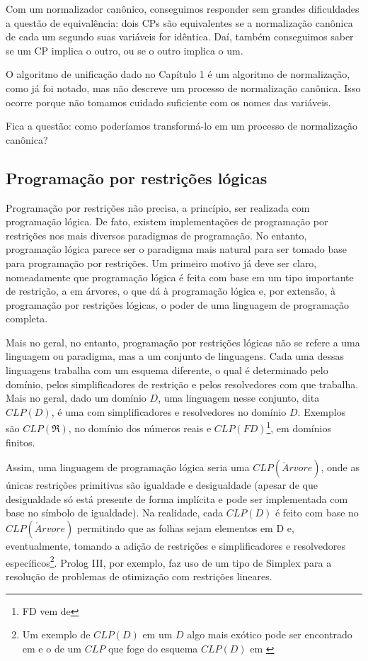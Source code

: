  Com um normalizador canônico, conseguimos responder sem grandes dificuldades a questão de equivalência: dois CPs são equivalentes se a normalização canônica de cada um segundo suas variáveis for idêntica. Daí, também conseguimos saber se um CP implica o outro, ou se o outro implica o um.

  O algoritmo de unificação dado no Capítulo 1 %
é um algoritmo de normalização, como já foi notado, mas não descreve um processo de normalização canônica. Isso ocorre porque não tomamos cuidado suficiente com os nomes das variáveis.

Fica a questão: como poderíamos transformá-lo em um processo de normalização canônica?

\subsection{Programação por restrições lógicas}

Programação por restrições não precisa, a princípio, ser realizada com programação lógica. De fato, existem implementações de
programação por restrições nos mais diversos paradigmas de programação. No entanto, programação lógica parece ser o paradigma mais natural
para ser tomado base para programação por restrições. Um primeiro motivo já deve ser claro, nomeadamente que programação lógica é feita com base em um tipo importante de restrição, a em árvores, o que dá à programação lógica e, por extensão, à programação
por restrições lógicas, o poder de uma linguagem de programação completa.

Mais no geral, no entanto, programação por restrições lógicas não se refere a uma linguagem ou paradigma, mas a um conjunto
de linguagens. Cada uma dessas linguagens trabalha com um esquema diferente, o qual é determinado pelo domínio,
pelos simplificadores de restrição e pelos resolvedores com que trabalha. Mais no geral, dado um domínio $D$,
uma linguagem nesse conjunto, dita $CLP(D)$, é uma com simplificadores e resolvedores no domínio $D$.
Exemplos são $CLP(\Re)$, no domínio dos números reais e $CLP(FD)$\footnote{FD vem de }, em domínios finitos.

Assim, uma linguagem de programação lógica  seria uma $CLP(\acute{A}rvore)$, onde as únicas restrições primitivas são igualdade e desigualdade (apesar de que desigualdade só está presente de forma implícita e pode ser implementada com base no símbolo de igualdade).
Na realidade, cada $CLP(D)$ é feito com base no $CLP(\acute{A}rvore)$ permitindo que as folhas sejam elementos em D e, eventualmente, tomando a adição de restrições e simplificadores e resolvedores específicos\footnote{Um exemplo de $CLP(D)$ em um $D$ algo mais exótico pode ser encontrado em \cite{besik} e o de um $CLP$ que foge do esquema $CLP(D)$ em \cite{margarida}}. Prolog III, por exemplo, faz uso de um tipo de Simplex para a resolução
de problemas de otimização com restrições lineares.



